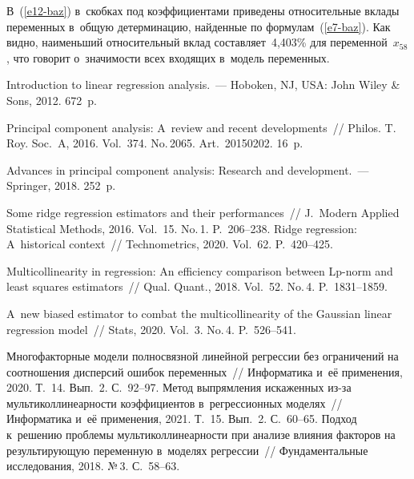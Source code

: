 \begin{multicols}{2}
  В~(\ref{e12-baz}) в~скобках под коэффициентами приведены относительные 
вкла\-ды переменных в~общую детерминацию, найденные по  
формулам~(\ref{e7-baz}). Как видно, наименьший относительный вклад 
со\-став\-ля\-ет~4,403\% для переменной~$x_{58}$, что говорит о~зна\-чи\-мости всех 
входящих в~модель переменных.
  
{\small\frenchspacing
 {%
 \begin{thebibliography}{99}
 Introduction to linear regression analysis.~--- 
Hoboken, NJ, USA: John Wiley \& Sons, 2012. 672~p.

 Principal component analysis: A~review and recent developments~// 
Philos. T. Roy. Soc.~A, 2016. Vol.~374. 
No.\,2065. Art.\ 20150202. 16~p.

 Advances in principal component analysis: Research and development.~--- 
Springer, 2018. 252~p.

 Some ridge regression estimators and their performances~// 
J.~Modern Applied Statistical Methods, 2016. Vol.~15. No.\,1. P.~206--238.
 Ridge regression: A~historical context~// Technometrics, 2020. Vol.~62.  
P.~420--425.

 Multicollinearity in regression: An efficiency 
comparison between Lp-norm and least squares estimators~// Qual. Quant., 2018. Vol.~52. No.\,4. P.~1831--1859.

 A~new biased estimator to combat the multicollinearity of the 
Gaussian linear regression model~// Stats, 2020. Vol.~3. No.\,4. P.~526--541.

 Многофакторные модели полносвязной линейной регрессии без 
ограничений на соотношения дисперсий ошибок переменных~// Информатика и~её 
применения, 2020. Т.~14. Вып.~2. С.~92--97.
 Метод выпрямления искаженных из-за мультиколлинеарности 
коэффициентов в~регрессионных моделях~// Информатика и~её применения, 2021. Т.~15. 
Вып.~2. С.~60--65.
 Подход к~решению проблемы мультиколлинеарности при анализе 
влияния факторов на результирующую переменную в~моделях регрессии~// 
Фундаментальные исследования, 2018. №\,3. С.~\mbox{58--63}.

\end{thebibliography}

 }
 }

\end{multicols}

